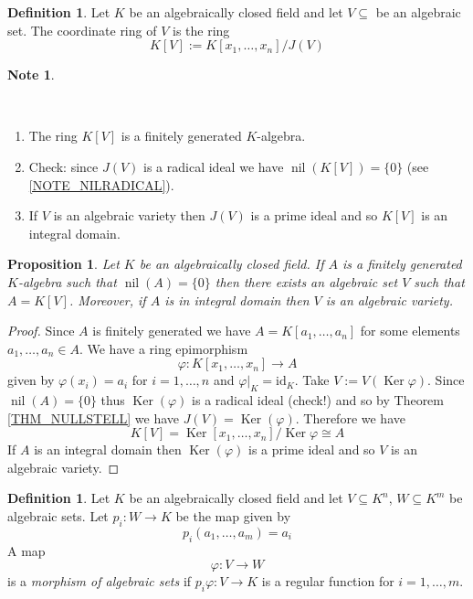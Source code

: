 \documentclass[12pt, letterpaper, oneside]{article}
\theoremstyle{plain}
\newtheorem{proposition}[theorem]{Proposition}
\theoremstyle{definition}
\newtheorem{definition}[theorem]{Definition}
\newtheorem{note}[theorem]{Note}
\newcommand{\id}{\mathrm{id}}
\newcommand{\Ker}{\operatorname{Ker}}
\newcommand{\nil}{\operatorname{nil}}
\newcommand{\benu}{\begin{enumerate}}
\newcommand{\eenu}{\end{enumerate}}
\newcommand{\vs}{\vskip 5mm}
\begin{document}
\vs\vs

\begin{definition}
Let $K$ be an algebraically closed field and let $V\subseteq$ be an algebraic set. 
The coordinate ring of $V$ is the ring 
$$K[V] := K[x_{1}, \dots, x_{n}]/J(V)$$
\end{definition}

\vs\vs\vs\vs\vs

\begin{note}\ 

\vskip -13mm

\ 
\benu
\item The ring  $K[V]$ is a finitely generated $K$-algebra. 


\item Check: since $J(V)$ is a radical ideal
we have  $\nil(K[V]) = \{0\}$ (see \ref{NOTE_NILRADICAL}).  

\item If $V$ is an algebraic variety then $J(V)$ is a prime ideal and so $K[V]$
is an integral domain. 
\eenu

\end{note}


\vs\vs

\begin{proposition}
Let $K$ be an algebraically closed field. If $A$ is a finitely generated $K$-algebra
such that $\nil(A) = \{0\}$ then  there exists an algebraic set $V$ such that $A= K[V]$. 
Moreover, if $A$ is in integral domain then $V$ is an algebraic variety.
\end{proposition}

\vs

\begin{proof}
Since $A$ is finitely generated we have $A = K[a_{1}, \dots, a_{n}]$
for some elements $a_{1}, \dots, a_{n}\in A$. We have a  ring epimorphism
$$\varphi \colon K[x_{1}, \dots, x_{n}] \to A$$
given by $\varphi(x_{i}) = a_{i}$ for $i=1, \dots, n$ and $\varphi|_{K} = \id_{K}$. 
Take $V := V(\Ker{\varphi})$.  Since $\nil(A) = \{0\}$ thus $\Ker(\varphi)$ is a radical ideal 
(check!) and so by Theorem \ref{THM_NULLSTELL} we have $J(V) = \Ker(\varphi)$. 
Therefore we have 
$$K[V] =  \Ker[x_{1}, \dots, x_{n}]/\Ker{\varphi} \cong A$$
If $A$ is an integral domain then $\Ker(\varphi)$ is a prime ideal and so $V$ is an 
algebraic variety. 

\end{proof}


\vs\vs

\begin{definition}
Let $K$ be an algebraically closed field and let $V\subseteq K^{n}$, $W\subseteq K^{m}$
be algebraic sets. Let $p_{i}\colon W \to K$ be the map given by 
$$p_{i}(a_{1}, \dots, a_{m}) = a_{i}$$
A map
$$\varphi \colon V \to W$$ 
is a \emph{morphism of algebraic sets}  
if $p_{i}\varphi \colon V \to K$ is a regular function for $i=1, \dots, m$.
\end{definition}
\end{document}

